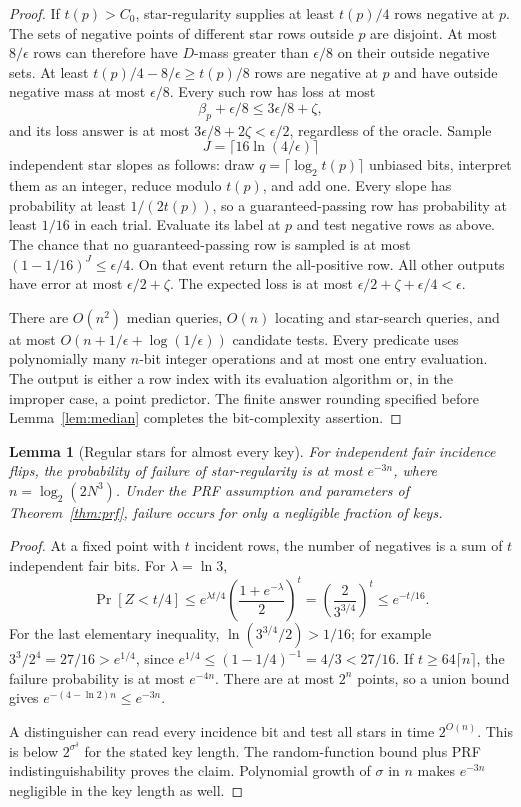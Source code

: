 \documentclass[11pt]{article}
\newtheorem{lemma}[theorem]{Lemma}
\newcommand{\1}{\mathbf 1}
\begin{document}
\begin{proof}
If $t(p)>C_0$, star-regularity supplies at least $t(p)/4$ rows negative at $p$. The sets of negative points of different star rows outside $p$ are disjoint. At most $8/\epsilon$ rows can therefore have $D$-mass greater than $\epsilon/8$ on their outside negative sets. At least $t(p)/4-8/\epsilon\ge t(p)/8$ rows are negative at $p$ and have outside negative mass at most $\epsilon/8$. Every such row has loss at most
\[
 \beta_p+\epsilon/8\le3\epsilon/8+\zeta,
\]
and its loss answer is at most $3\epsilon/8+2\zeta<\epsilon/2$, regardless of the oracle. Sample
\[
 J=\lceil16\ln(4/\epsilon)\rceil
\]
independent star slopes as follows: draw $q=\lceil\log_2t(p)\rceil$ unbiased bits, interpret them as an integer, reduce modulo $t(p)$, and add one. Every slope has probability at least $1/(2t(p))$, so a guaranteed-passing row has probability at least $1/16$ in each trial. Evaluate its label at $p$ and test negative rows as above. The chance that no guaranteed-passing row is sampled is at most $(1-1/16)^J\le\epsilon/4$. On that event return the all-positive row. All other outputs have error at most $\epsilon/2+\zeta$. The expected loss is at most $\epsilon/2+\zeta+\epsilon/4<\epsilon$.

There are $O(n^2)$ median queries, $O(n)$ locating and star-search queries, and at most $O(n+1/\epsilon+\log(1/\epsilon))$ candidate tests. Every predicate uses polynomially many $n$-bit integer operations and at most one entry evaluation. The output is either a row index with its evaluation algorithm or, in the improper case, a point predictor. The finite answer rounding specified before Lemma~\ref{lem:median} completes the bit-complexity assertion.
\end{proof}

\begin{samepage}
\begin{lemma}[Regular stars for almost every key]\label{lem:regularstars}
For independent fair incidence flips, the probability of failure of star-regularity is at most $e^{-3n}$, where $n=\log_2(2N^3)$. Under the PRF assumption and parameters of Theorem~\ref{thm:prf}, failure occurs for only a negligible fraction of keys.
\end{lemma}
\end{samepage}
\begin{proof}
At a fixed point with $t$ incident rows, the number of negatives is a sum of $t$ independent fair bits. For $\lambda=\ln3$,
\[
 \Pr[Z<t/4]\le e^{\lambda t/4}\left(\frac{1+e^{-\lambda}}2\right)^t
 =\left(\frac{2}{3^{3/4}}\right)^t\le e^{-t/16}.
\]
For the last elementary inequality, $\ln(3^{3/4}/2)>1/16$; for example $3^3/2^4=27/16>e^{1/4}$, since $e^{1/4}\le(1-1/4)^{-1}=4/3<27/16$. If $t\ge64\lceil n\rceil$, the failure probability is at most $e^{-4n}$. There are at most $2^n$ points, so a union bound gives $e^{-(4-\ln2)n}\le e^{-3n}$.

A distinguisher can read every incidence bit and test all stars in time $2^{O(n)}$. This is below $2^{\sigma^\delta}$ for the stated key length. The random-function bound plus PRF indistinguishability proves the claim. Polynomial growth of $\sigma$ in $n$ makes $e^{-3n}$ negligible in the key length as well.
\end{proof}
\end{document}
